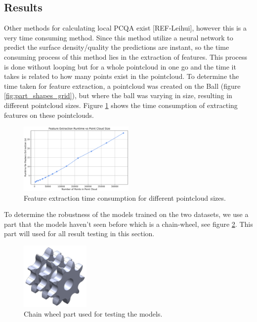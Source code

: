 \subsection{Results}

Other methods for calculating local PCQA exist [REF-Leihui], however this is a very time consuming method. Since this method utilize a neural network to predict the surface density/quality the predictions are instant, so the time consuming process of this method lies in the extraction of features. This process is done without looping but for a whole pointcloud in one go and the time it takes is related to how many points exist in the pointcloud. To determine the time taken for feature extraction, a pointcloud was created on the Ball (figure \ref{fig:part_shapes_grid}), but where the ball was varying in size, resulting in different pointcloud sizes. Figure \ref{fig:time} shows the time consumption of extracting features on these pointclouds.

\begin{figure}[htbp]
    \centering
    \includegraphics[width=0.5\textwidth]{figures/time_lowQ.png}
    \caption{Feature extraction time consumption for different pointcloud sizes.}
    \label{fig:time}
\end{figure}

To determine the robustness of the models trained on the two datasets, we use a part that the models haven't seen before which is a chain-wheel, see figure \ref{fig:chain_wheel}. This part will used for all result testing in this section.
\begin{figure}[htbp]
    \centering
    \includegraphics[width=0.3\textwidth]{figures/Chain_whee.PNG}
    \caption{Chain wheel part used for testing the models.} 
    \label{fig:chain_wheel}
\end{figure}

